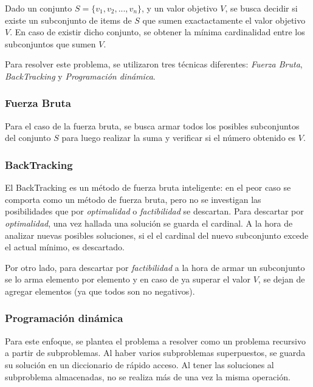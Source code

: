 \par Dado un conjunto $S = \{v_1,v_2,...,v_n\}$, y un valor objetivo $V$, se busca decidir si existe un subconjunto
de items de $S$ que sumen exactactamente el valor objetivo $V$. En caso de existir dicho conjunto, se obtener la
m\'inima cardinalidad entre los subconjuntos que sumen $V$.

\par Para resolver este problema, se utilizaron tres t\'ecnicas diferentes: \emph{Fuerza Bruta}, \emph{BackTracking}
y \emph{Programaci\'on din\'amica}.

\subsubsection{Fuerza Bruta}
\par Para el caso de la fuerza bruta, se busca armar todos los posibles subconjuntos del conjunto $S$ para luego realizar
la suma y verificar si el n\'umero obtenido es $V$.

\subsubsection{BackTracking}
\par El BackTracking es un m\'etodo de fuerza bruta inteligente: en el peor caso se comporta como un m\'etodo de fuerza
bruta, pero no se investigan las posibilidades que por \emph{optimalidad } o \emph{factibilidad} se descartan.
Para descartar por \emph{optimalidad}, una vez hallada una soluci\'on se guarda el cardinal. A la hora de analizar nuevas
posibles soluciones, si el el cardinal del nuevo subconjunto excede el actual m\'inimo, es descartado. \par
Por otro lado, para descartar por \emph{factibilidad} a la hora de armar un subconjunto se lo arma elemento por elemento
y en caso de ya superar el valor $V$, se dejan de agregar elementos (ya que todos son no negativos).


\subsubsection{Programaci\'on din\'amica}
\par Para este enfoque, se plantea el problema a resolver como un problema recursivo a partir de subproblemas.
Al haber varios subproblemas superpuestos, se guarda su soluci\'on en un diccionario de r\'apido acceso. Al tener las 
soluciones al subproblema almacenadas, no se realiza m\'as de una vez la misma operaci\'on.